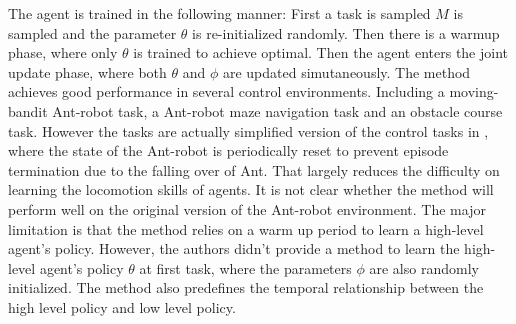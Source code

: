 The agent is trained in the following manner: First a task is sampled $M$ is sampled and the parameter $\theta$ is re-initialized randomly. Then there is a warmup phase, where only $\theta$ is trained to achieve optimal. Then the agent enters the joint update phase, where both $\theta$ and $\phi$ are updated simutaneously.
The method achieves good performance in several control environments. Including a moving-bandit Ant-robot task, a Ant-robot maze navigation task and an obstacle course task. However the tasks are actually simplified version of the control tasks in \cite{duan2016benchmarking}, where the state of the Ant-robot is periodically reset to prevent episode termination due to the falling over of Ant. That largely reduces the difficulty on learning the locomotion skills of agents. It is not clear whether the method will perform well on the original version of the Ant-robot environment.
The major limitation is that the method relies on a warm up period to learn a high-level agent's policy. However, the authors didn't provide a method to learn the high-level agent's policy $\theta$ at first task, where the parameters $\phi$ are also randomly initialized.
The method also predefines the temporal relationship between the high level policy and low level policy.
